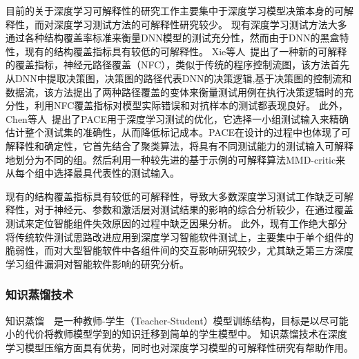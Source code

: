 目前的关于深度学习可解释性的研究工作主要集中于深度学习模型决策本身的可解释性，而对深度学习测试方法的可解释性研究较少。
现有深度学习测试方法大多通过各种结构覆盖率标准来衡量DNN模型的测试充分性，然而由于DNN的黑盒特性，现有的结构覆盖指标具有较低的可解释性。
Xie等人~提出了一种新的可解释的覆盖指标，神经元路径覆盖（NFC），类似于传统的程序控制流图，该方法首先从DNN中提取决策图，决策图的路径代表DNN的决策逻辑,基于决策图的控制流和数据流，该方法提出了两种路径覆盖的变体来衡量测试用例在执行决策逻辑时的充分性，利用NFC覆盖指标对模型实际错误和对抗样本的测试都表现良好。
此外，Chen等人~提出了PACE用于深度学习测试的优化，它选择一小组测试输入来精确估计整个测试集的准确性，从而降低标记成本。PACE在设计的过程中也体现了可解释性和确定性，它首先结合了聚类算法，将具有不同测试能力的测试输入可解释地划分为不同的组。然后利用一种较先进的基于示例的可解释算法MMD-critic来从每个组中选择最具代表性的测试输入。

现有的结构覆盖指标具有较低的可解释性，导致大多数深度学习测试工作缺乏可解释性，对于神经元、参数和激活层对测试结果的影响的综合分析较少，在通过覆盖测试来定位智能组件失效原因的过程中缺乏因果分析。
此外，现有工作绝大部分将传统软件测试思路改进应用到深度学习智能软件测试上，主要集中于单个组件的脆弱性，而对大型智能软件中各组件间的交互影响研究较少，尤其缺乏第三方深度学习组件漏洞对智能软件影响的研究分析。




\subsubsection{知识蒸馏技术}

知识蒸馏~~是一种教师-学生（Teacher-Student）模型训练结构，目标是以尽可能小的代价将教师模型学到的知识迁移到简单的学生模型中。
知识蒸馏技术在深度学习模型压缩方面具有优势，同时也对深度学习模型的可解释性研究有帮助作用。

